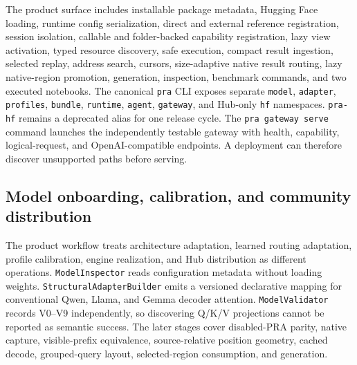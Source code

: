 \documentclass[11pt]{article}
\begin{document}
The product surface includes installable package metadata, Hugging Face loading,
runtime config serialization, direct and external reference registration,
session isolation, callable and folder-backed capability registration, lazy
view activation, typed resource discovery, safe execution, compact result
ingestion, selected replay, address search, cursors, size-adaptive native result
routing, lazy native-region promotion, generation, inspection, benchmark
commands, and two executed notebooks. The canonical \texttt{pra} CLI exposes
separate \texttt{model}, \texttt{adapter}, \texttt{profiles}, \texttt{bundle},
\texttt{runtime}, \texttt{agent}, \texttt{gateway}, and Hub-only \texttt{hf}
namespaces. \texttt{pra-hf} remains a deprecated alias for one release cycle.
The \texttt{pra gateway serve} command launches the independently testable
gateway with health, capability, logical-request, and OpenAI-compatible
endpoints. A deployment can therefore
discover unsupported paths before serving.

\subsection{Model onboarding, calibration, and community distribution}

The product workflow treats architecture adaptation, learned routing
adaptation, profile calibration, engine realization, and Hub distribution as
different operations. \texttt{ModelInspector} reads configuration metadata
without loading weights. \texttt{StructuralAdapterBuilder} emits a versioned
declarative mapping for conventional Qwen, Llama, and Gemma decoder attention.
\texttt{ModelValidator} records V0--V9 independently, so discovering Q/K/V
projections cannot be reported as semantic success. The later stages cover
disabled-PRA parity, native capture, visible-prefix equivalence, source-relative
position geometry, cached decode, grouped-query layout, selected-region
consumption, and generation.
\end{document}
